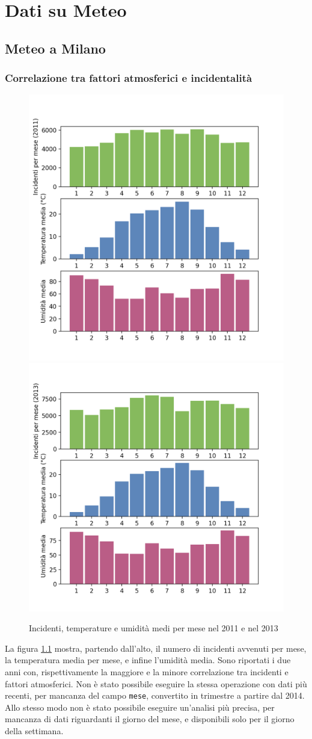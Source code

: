 \documentclass[a4paper]{report}
\newcommand{\columnstyle}[1]{\texttt{#1}}
\begin{document}
\chapter{Dati su Meteo}

\section{Meteo a Milano}

\subsection{Correlazione tra fattori atmosferici e incidentalità}

\begin{figure}
    \includegraphics[width=0.5\linewidth]{../src/meteo/temp_incidenti_2011.png}
    \includegraphics[width=0.5\linewidth]{../src/meteo/temp_incidenti_2013.png}
    \caption{Incidenti, temperature e umidità medi per mese nel 2011 e nel 2013}
    \label{fig:incidenti-temp}
\end{figure}

La figura \ref{fig:incidenti-temp} mostra, partendo dall'alto, il numero di incidenti 
avvenuti per mese, la temperatura media per mese, e infine l'umidità media.
Sono riportati i due anni con, rispettivamente la maggiore e la minore correlazione tra 
incidenti e fattori atmosferici.
Non è stato possibile eseguire la stessa operazione con dati più recenti, per mancanza del 
campo \columnstyle{mese}, convertito in trimestre a partire dal 2014.
Allo stesso modo non è stato possibile eseguire un'analisi più precisa, per mancanza di dati 
riguardanti il giorno del mese, e disponibili solo per il giorno della settimana.
\end{document}
